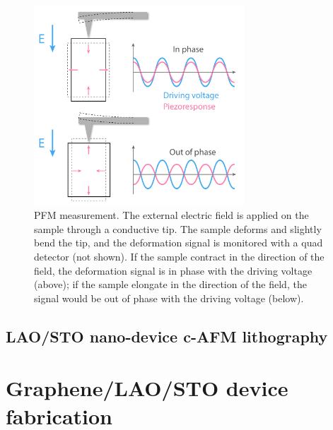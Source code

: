 \documentclass[pdflatex, sectionletters, 12pt]{pittetd}    %
\begin{document}
\begin{figure}[h!]
	\centering
	\includegraphics[width=0.7\textwidth]{Drawing/PFM.pdf}
	\caption{PFM measurement. The external electric field is applied on the sample through a conductive tip. The sample deforms and slightly bend the tip, and the deformation signal is monitored with a quad detector (not shown). If the sample contract in the direction of the field, the deformation signal is in phase with the driving voltage (above); if the sample elongate in the direction of the field, the signal would be out of phase with the driving voltage (below).}
	\label{FIG:PFM}
\end{figure}

\subsection{LAO/STO nano-device c-AFM lithography}



\section{Graphene/LAO/STO device fabrication}
\end{document}
